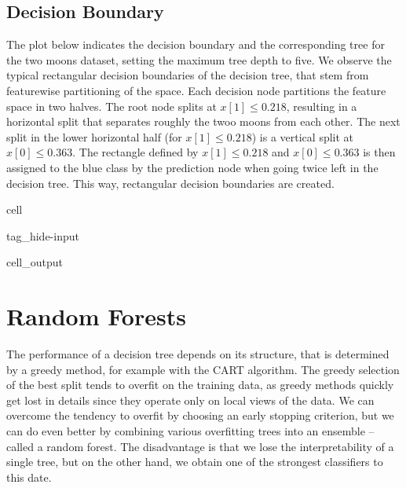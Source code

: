 \documentclass[letterpaper,10pt,english]{jupyterBook}
\begin{document}
\subsection{Decision Boundary}
\label{\detokenize{classification_decision_trees:decision-boundary}}
\sphinxAtStartPar
The plot below indicates the decision boundary and the corresponding tree for the two moons dataset, setting the maximum tree depth to five. We observe the typical rectangular decision boundaries of the decision tree, that stem from feature\sphinxhyphen{}wise partitioning of the space. Each decision node partitions the feature space in two halves. The root node splits at \(x[1]\leq 0.218\), resulting in a horizontal split that separates roughly the twoo moons from each other. The next split in the lower horizontal half (for \(x[1]\leq 0.218\)) is a vertical split at \(x[0]\leq 0.363\). The rectangle defined by \(x[1]\leq 0.218\) and \(x[0]\leq 0.363\) is then assigned to the blue class by the prediction node when going twice left in the decision tree. This way, rectangular decision boundaries are created.

\begin{sphinxuseclass}{cell}
\begin{sphinxuseclass}{tag_hide-input}\begin{sphinxVerbatimOutput}

\begin{sphinxuseclass}{cell_output}
\noindent{}

\end{sphinxuseclass}\end{sphinxVerbatimOutput}

\end{sphinxuseclass}
\end{sphinxuseclass}
\sphinxstepscope


\section{Random Forests}
\label{\detokenize{classification_random_forests:random-forests}}\label{\detokenize{classification_random_forests::doc}}
\sphinxAtStartPar
The performance of a decision tree depends on its structure, that is determined by a greedy method, for example with the CART algorithm. The greedy selection of the best split tends to overfit on the training data, as greedy methods quickly get lost in details since they operate only on local views of the data. We can overcome the tendency to overfit by choosing an early stopping criterion, but we can do even better by combining various overfitting trees into an ensemble – called a random forest. The disadvantage is that we lose the interpretability of a single tree, but on the other hand, we obtain one of the strongest classifiers to this date.
\end{document}

